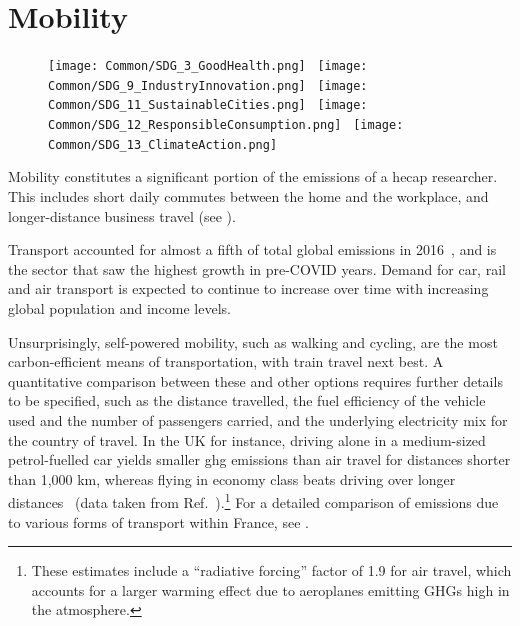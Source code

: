 \documentclass[../SustainableHEP.tex]{subfiles}
\begin{document}
\RaggedRight
\sloppy
\newpage


\section{Mobility}
\label{sec:Travel}


\begin{figure}
\texttt{[image: Common/SDG\_3\_GoodHealth.png]}~%
\texttt{[image: Common/SDG\_9\_IndustryInnovation.png]}~%
\texttt{[image: Common/SDG\_11\_SustainableCities.png]}~%
\texttt{[image: Common/SDG\_12\_ResponsibleConsumption.png]}~%
\texttt{[image: Common/SDG\_13\_ClimateAction.png]}
\end{figure}


\exSum

\noindent Mobility constitutes a significant portion of the emissions of a \acrshort{hecap} researcher.  This includes short daily commutes between the home and the workplace, and longer-distance business travel (see ).

Transport accounted for almost a fifth of total global emissions in 2016~\cite{OWIDsector}, and is the sector that saw the highest growth in pre-COVID years\cite{SLOCAT}.  Demand for car, rail and air transport is expected to continue to increase over time with increasing global population and income levels.

Unsurprisingly, self-powered mobility, such as walking and cycling, are the most carbon-efficient means of transportation, with train travel next best.  A quantitative comparison between these and other options requires further details to be specified, such as the distance travelled, the fuel efficiency of the vehicle used and the number of passengers carried, and the underlying electricity mix for the country of travel.  In the UK for instance, driving alone in a medium-sized petrol-fuelled car yields smaller \acrshort{ghg} emissions than air travel for distances shorter than 1,000 km, whereas flying in economy class beats driving over longer distances~\cite{OWIDtravel} (data taken from Ref.~\cite{BEIS}).\footnote{\label{radiative_forcing_foot}These estimates include a ``radiative forcing'' factor of 1.9 for air travel, which accounts for a larger warming effect due to aeroplanes emitting GHGs high in the atmosphere.} 
For a detailed comparison of emissions due to various forms of transport within France, see .
\end{document}
